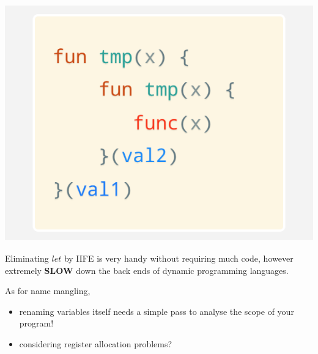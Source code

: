 \documentclass[a1,portrait]{a1poster}
\begin{document}
\begin{multicols}{2}
\begin{multicols}{3}
\begin{minipage}[b]{1\linewidth}
\begin{center}\vspace{0.1cm}
\includegraphics[width=0.9\linewidth]{figs/let-by-im-call.png}
\end{center}\vspace{0.1cm}
\end{minipage}

\end{multicols}

 Eliminating $let$ by IIFE is very handy without requiring much code, however
 extremely \textbf{SLOW} down the back ends of dynamic programming languages.

 As for name mangling,

\begin{itemize}
    \setlength\itemsep{-0.2em}
    \item renaming variables itself needs a simple pass to analyse the scope of your program!
    \item considering register allocation problems?
\end{itemize}

\begin{multicols}{2}


\end{multicols}
\end{multicols}
\end{document}
